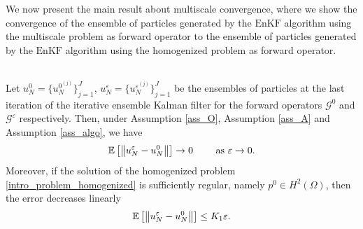 \documentclass[10pt]{article}
\begin{document}
We now present the main result about multiscale convergence, where we show the convergence of the ensemble of particles generated by the $\mathrm{EnKF}$ algorithm using the multiscale problem as forward operator to the ensemble of particles generated by the $\mathrm{EnKF}$ algorithm using the homogenized problem as forward operator.

\begin{proposition}
\label{convergence_result}
\leavevmode \\
Let $u_{N}^0 = \{ u_{N}^{0^{(j)}} \}_{j=1}^J$, $u_N^{\varepsilon} = \{ u_N^{\varepsilon^{(j)}} \}_{j=1}^J$ be the ensembles of particles at the last iteration of the iterative ensemble Kalman filter for the forward operators $\mathcal{G}^0$ and $\mathcal{G}^{\varepsilon}$ respectively. Then, under Assumption \ref{ass_O}, Assumption \ref{ass_A} and Assumption \ref{ass_algo}, we have
\[ \mathbb{E} \left [ \left\|u_N^{\varepsilon} - u_N^0\right\| \right ] \to 0 \qquad \text{ as } \varepsilon \to 0.  \]
Moreover, if the solution of the homogenized problem \eqref{intro_problem_homogenized} is sufficiently regular, namely $p^0 \in H^2(\Omega)$, then the error decreases linearly
\[ \mathbb{E} \left [ \left\|u_N^{\varepsilon} - u_N^0\right\| \right ] \le K_1 \varepsilon. \]
\end{proposition}
\end{document}
